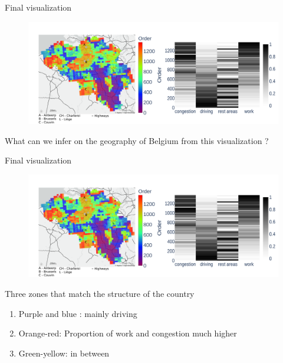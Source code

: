 \documentclass[10pt]{beamer}
\begin{document}
\begin{frame}{Final visualization}
    \begin{figure}
        \centering
        \includegraphics[scale=0.22]{figures/final-result.pdf}
    \end{figure}

    What can we infer on the geography of Belgium from this visualization ?
\end{frame}

\begin{frame}{Final visualization}
    \begin{figure}
        \centering
        \includegraphics[scale=0.22]{figures/final-result.pdf}
    \end{figure}
    Three zones that match the structure of the country
    \begin{enumerate}
        \item Purple and blue : mainly driving
        \item Orange-red: Proportion of work and congestion much higher
        \item Green-yellow: in between
    \end{enumerate}
\end{frame}
\end{document}

